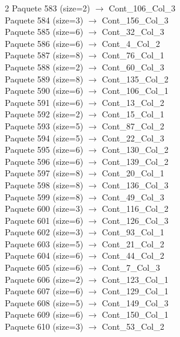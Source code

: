 \begin{multicols}{2}
Paquete 583 (size=2) $\rightarrow$ Cont\_106\_Col\_3\\
Paquete 584 (size=3) $\rightarrow$ Cont\_156\_Col\_3\\
Paquete 585 (size=6) $\rightarrow$ Cont\_32\_Col\_3\\
Paquete 586 (size=6) $\rightarrow$ Cont\_4\_Col\_2\\
Paquete 587 (size=8) $\rightarrow$ Cont\_76\_Col\_1\\
Paquete 588 (size=2) $\rightarrow$ Cont\_60\_Col\_3\\
Paquete 589 (size=8) $\rightarrow$ Cont\_135\_Col\_2\\
Paquete 590 (size=6) $\rightarrow$ Cont\_106\_Col\_1\\
Paquete 591 (size=6) $\rightarrow$ Cont\_13\_Col\_2\\
Paquete 592 (size=2) $\rightarrow$ Cont\_15\_Col\_1\\
Paquete 593 (size=5) $\rightarrow$ Cont\_87\_Col\_2\\
Paquete 594 (size=5) $\rightarrow$ Cont\_22\_Col\_3\\
Paquete 595 (size=6) $\rightarrow$ Cont\_130\_Col\_2\\
Paquete 596 (size=6) $\rightarrow$ Cont\_139\_Col\_2\\
Paquete 597 (size=8) $\rightarrow$ Cont\_20\_Col\_1\\
Paquete 598 (size=8) $\rightarrow$ Cont\_136\_Col\_3\\
Paquete 599 (size=8) $\rightarrow$ Cont\_49\_Col\_3\\
Paquete 600 (size=3) $\rightarrow$ Cont\_116\_Col\_2\\
Paquete 601 (size=6) $\rightarrow$ Cont\_126\_Col\_3\\
Paquete 602 (size=3) $\rightarrow$ Cont\_93\_Col\_1\\
Paquete 603 (size=5) $\rightarrow$ Cont\_21\_Col\_2\\
Paquete 604 (size=6) $\rightarrow$ Cont\_44\_Col\_2\\
Paquete 605 (size=6) $\rightarrow$ Cont\_7\_Col\_3\\
Paquete 606 (size=2) $\rightarrow$ Cont\_123\_Col\_1\\
Paquete 607 (size=6) $\rightarrow$ Cont\_129\_Col\_1\\
Paquete 608 (size=5) $\rightarrow$ Cont\_149\_Col\_3\\
Paquete 609 (size=6) $\rightarrow$ Cont\_150\_Col\_1\\
Paquete 610 (size=3) $\rightarrow$ Cont\_53\_Col\_2\\

\end{multicols}
